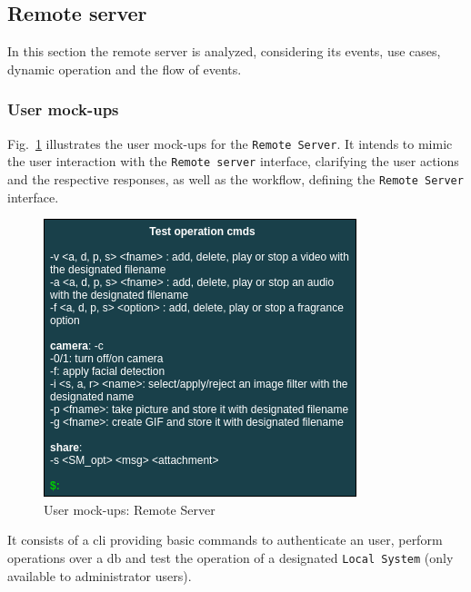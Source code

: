 %
\subsection{Remote server}
\label{sec:remote-serv-decomp}
In this section the remote server is analyzed, considering its events, use
cases, dynamic operation and the flow of events.

\subsubsection{User mock-ups}
\label{sec:user-mockups-2}
Fig.~\ref{fig:user-mockups-rs} illustrates the user mock-ups for the
\texttt{Remote Server}. It intends to mimic the user interaction with the
\texttt{Remote server} interface,
clarifying the user actions and the respective responses, as well as the
workflow, defining the \texttt{Remote Server} interface.
%
\begin{figure}[htb!]
\centering
    \includegraphics[width=1.0\columnwidth]{./img/user-mockups-rs.png}
  \caption{User mock-ups: Remote Server}%
\label{fig:user-mockups-rs}
\end{figure}

It consists of a \gls{cli} providing basic commands to authenticate an user,
perform operations over a \gls{db} and test the operation of a designated
\texttt{Local System} (only available to administrator users).

